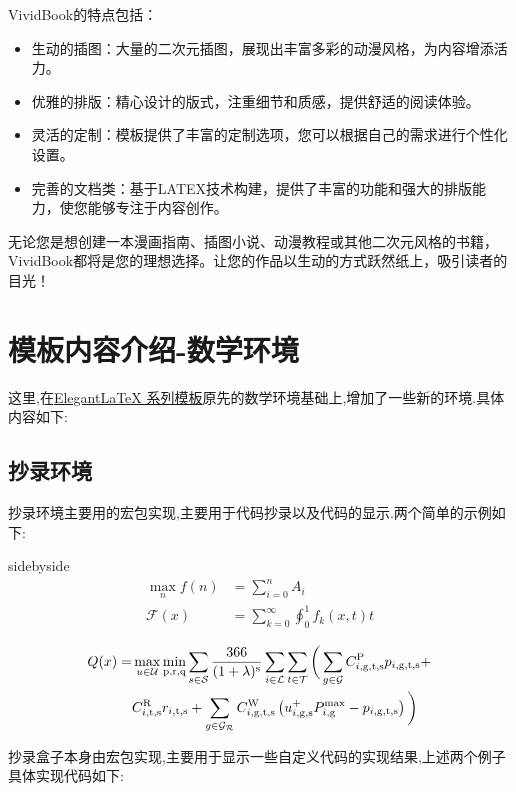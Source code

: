 VividBook的特点包括：
\begin{itemize}
\item 生动的插图：大量的二次元插图，展现出丰富多彩的动漫风格，为内容增添活力。

\item 优雅的排版：精心设计的版式，注重细节和质感，提供舒适的阅读体验。

\item 灵活的定制：模板提供了丰富的定制选项，您可以根据自己的需求进行个性化设置。

\item 完善的文档类：基于LATEX技术构建，提供了丰富的功能和强大的排版能力，使您能够专注于内容创作。
\end{itemize}
无论您是想创建一本漫画指南、插图小说、动漫教程或其他二次元风格的书籍，VividBook都将是您的理想选择。让您的作品以生动的方式跃然纸上，吸引读者的目光！

\newpage

\section{模板内容介绍-数学环境}
这里,在\href{https://elegantlatex.org/}{Elegant\LaTeX{} 系列模板}原先的数学环境基础上,增加了一些新的环境.具体内容如下:

\subsection{抄录环境}
抄录环境主要用的宏包实现,主要用于代码抄录以及代码的显示.两个简单的示例如下:

\begin{tcblisting}{sidebyside}
\begin{align}
    \max_nf(n)&=\sum\nolimits_{i=0}^n A_i\\
    \mathcal{F}(x) &=\sum_{k=0}^\infty
    \oint_0^1 f_k(x,t) t
\end{align}
\end{tcblisting}

\begin{tcblisting}{}
\begin{align}\begin{aligned}
        Q(x)=&\max \limits_{u\in {\cal U}} \min\limits_\text{p,r,q}
        \sum\limits_{s\in {\cal S}} \frac{366}{(1+\lambda )^{\rm s}}\sum\limits_{i\in
            {\cal L}} \sum\limits_{t\in {\cal T}} \bigg(\sum\limits_{g\in {\cal G}}
        C_{i,\rm {g,t,s}}^{\rm P} p_{i,\rm {g,t,s}}+\\
        &C_{i,\rm {t,s}}^{\rm R} r_{i,\rm {t,s}}+
        \sum\limits_{g\in {\cal {G_{\cal R}}}}C_{i,\rm {g,t,s}}^{\rm W} \left(u_{i,\rm {g,s}}^{+}
        P_{i,\rm g}^{\max} -p_{i,\rm {g,t,s}}\right)\bigg)
\end{aligned}\end{align}
\end{tcblisting}
抄录盒子本身由宏包实现,主要用于显示一些自定义代码的实现结果,上述两个例子具体实现代码如下:

